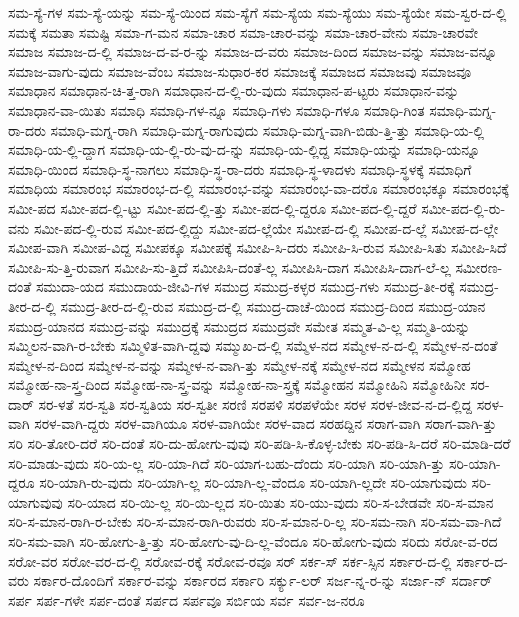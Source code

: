 {ಸಮ-ಸ್ಯೆ-ಗಳ
ಸಮ-ಸ್ಯೆ-ಯನ್ನು
ಸಮ-ಸ್ಯೆ-ಯಿಂದ
ಸಮ-ಸ್ಯೆಗೆ
ಸಮ-ಸ್ಯೆಯ
ಸಮ-ಸ್ಯೆಯು
ಸಮ-ಸ್ಯೆಯೇ
ಸಮ-ಸ್ವರ-ದ-ಲ್ಲಿ
ಸಮಕ್ಕೆ
ಸಮತಾ
ಸಮಷ್ಟಿ
ಸಮಾ-ಗ-ಮನ
ಸಮಾ-ಚಾರ
ಸಮಾ-ಚಾರ-ವನ್ನು
ಸಮಾ-ಚಾರ-ವೇನು
ಸಮಾ-ಚಾರವೇ
ಸಮಾಜ
ಸಮಾಜ-ದ-ಲ್ಲಿ
ಸಮಾಜ-ದ-ವ-ರ-ನ್ನು
ಸಮಾಜ-ದ-ವರು
ಸಮಾಜ-ದಿಂದ
ಸಮಾಜ-ವನ್ನು
ಸಮಾಜ-ವನ್ನೂ
ಸಮಾಜ-ವಾಗು-ವುದು
ಸಮಾಜ-ವೆಂಬ
ಸಮಾಜ-ಸುಧಾರ-ಕರ
ಸಮಾಜಕ್ಕೆ
ಸಮಾಜದ
ಸಮಾಜವು
ಸಮಾಜವೂ
ಸಮಾಧಾನ
ಸಮಾಧಾನ-ಚಿ-ತ್ತ-ರಾಗಿ
ಸಮಾಧಾನ-ದ-ಲ್ಲಿ-ರು-ವುದು
ಸಮಾಧಾನ-ಪ-ಟ್ಟರು
ಸಮಾಧಾನ-ವನ್ನು
ಸಮಾಧಾನ-ವಾ-ಯಿತು
ಸಮಾಧಿ
ಸಮಾಧಿ-ಗಳ-ನ್ನೂ
ಸಮಾಧಿ-ಗಳು
ಸಮಾಧಿ-ಗಳೂ
ಸಮಾಧಿ-ಗಿಂತ
ಸಮಾಧಿ-ಮಗ್ನ-ರಾ-ದರು
ಸಮಾಧಿ-ಮಗ್ನ-ರಾಗಿ
ಸಮಾಧಿ-ಮಗ್ನ-ರಾಗುವುದು
ಸಮಾಧಿ-ಮಗ್ನ-ವಾಗಿ-ಬಿಡು-ತ್ತಿ-ತ್ತು
ಸಮಾಧಿ-ಯ-ಲ್ಲಿ
ಸಮಾಧಿ-ಯ-ಲ್ಲಿ-ದ್ದಾಗ
ಸಮಾಧಿ-ಯ-ಲ್ಲಿ-ರು-ವು-ದ-ನ್ನು
ಸಮಾಧಿ-ಯ-ಲ್ಲಿದ್ದ
ಸಮಾಧಿ-ಯನ್ನು
ಸಮಾಧಿ-ಯನ್ನೂ
ಸಮಾಧಿ-ಯಿಂದ
ಸಮಾಧಿ-ಸ್ಥ-ನಾಗಲು
ಸಮಾಧಿ-ಸ್ಥ-ರಾ-ದರು
ಸಮಾಧಿ-ಸ್ಥ-ಳಾದಳು
ಸಮಾಧಿ-ಸ್ಥಳಕ್ಕೆ
ಸಮಾಧಿಗೆ
ಸಮಾಧಿಯ
ಸಮಾರಂಭ
ಸಮಾರಂಭ-ದ-ಲ್ಲಿ
ಸಮಾರಂಭ-ವನ್ನು
ಸಮಾರಂಭ-ವಾ-ದರೊ
ಸಮಾರಂಭಕ್ಕೂ
ಸಮಾರಂಭಕ್ಕೆ
ಸಮೀ-ಪದ
ಸಮೀ-ಪದ-ಲ್ಲಿ-ಟ್ಟು
ಸಮೀ-ಪದ-ಲ್ಲಿ-ತ್ತು
ಸಮೀ-ಪದ-ಲ್ಲಿ-ದ್ದರೂ
ಸಮೀ-ಪದ-ಲ್ಲಿ-ದ್ದರೆ
ಸಮೀ-ಪದ-ಲ್ಲಿ-ರು-ವನು
ಸಮೀ-ಪದ-ಲ್ಲಿ-ರುವ
ಸಮೀ-ಪದ-ಲ್ಲಿದ್ದು
ಸಮೀ-ಪದ-ಲ್ಲೆಯೇ
ಸಮೀಪ-ದ-ಲ್ಲಿ
ಸಮೀಪ-ದ-ಲ್ಲೆ
ಸಮೀಪ-ದ-ಲ್ಲೇ
ಸಮೀಪ-ವಾಗಿ
ಸಮೀಪ-ವಿದ್ದ
ಸಮೀಪಕ್ಕೂ
ಸಮೀಪಕ್ಕೆ
ಸಮೀಪಿ-ಸಿ-ದರು
ಸಮೀಪಿ-ಸಿ-ರುವ
ಸಮೀಪಿ-ಸಿತು
ಸಮೀಪಿ-ಸಿದೆ
ಸಮೀಪಿ-ಸು-ತ್ತಿ-ರುವಾಗ
ಸಮೀಪಿ-ಸು-ತ್ತಿದೆ
ಸಮೀಪಿಸಿ-ದಂತೆ-ಲ್ಲ
ಸಮೀಪಿಸಿ-ದಾಗ
ಸಮೀಪಿಸಿ-ದಾಗ-ಲೆ-ಲ್ಲ
ಸಮೀರಣ-ದಂತೆ
ಸಮುದಾ-ಯದ
ಸಮುದಾಯ-ಜೀವಿ-ಗಳ
ಸಮುದ್ರ
ಸಮುದ್ರ-ಕಳ್ಳರ
ಸಮುದ್ರ-ಗಳು
ಸಮುದ್ರ-ತೀ-ರಕ್ಕೆ
ಸಮುದ್ರ-ತೀರ-ದ-ಲ್ಲಿ
ಸಮುದ್ರ-ತೀರ-ದ-ಲ್ಲಿ-ರುವ
ಸಮುದ್ರ-ದ-ಲ್ಲಿ
ಸಮುದ್ರ-ದಾಚೆ-ಯಿಂದ
ಸಮುದ್ರ-ದಿಂದ
ಸಮುದ್ರ-ಯಾನ
ಸಮುದ್ರ-ಯಾನದ
ಸಮುದ್ರ-ವನ್ನು
ಸಮುದ್ರಕ್ಕೆ
ಸಮುದ್ರದ
ಸಮುದ್ರವೇ
ಸಮೇತ
ಸಮ್ಮತ-ವಿ-ಲ್ಲ
ಸಮ್ಮತಿ-ಯನ್ನು
ಸಮ್ಮಿಲನ-ವಾಗಿ-ರ-ಬೇಕು
ಸಮ್ಮಿಳಿತ-ವಾಗಿ-ದ್ದವು
ಸಮ್ಮುಖ-ದ-ಲ್ಲಿ
ಸಮ್ಮೆಳ-ನದ
ಸಮ್ಮೇಳ-ನ-ದ-ಲ್ಲಿ
ಸಮ್ಮೇಳ-ನ-ದಂತೆ
ಸಮ್ಮೇಳ-ನ-ದಿಂದ
ಸಮ್ಮೇಳ-ನ-ವನ್ನು
ಸಮ್ಮೇಳ-ನ-ವಾಗಿ-ತ್ತು
ಸಮ್ಮೇಳ-ನಕ್ಕೆ
ಸಮ್ಮೇಳ-ನದ
ಸಮ್ಮೇಳನ
ಸಮ್ಮೋಹ
ಸಮ್ಮೋಹ-ನಾ-ಸ್ತ್ರ-ದಿಂದ
ಸಮ್ಮೋಹ-ನಾ-ಸ್ತ್ರ-ವನ್ನು
ಸಮ್ಮೋಹ-ನಾ-ಸ್ತ್ರಕ್ಕೆ
ಸಮ್ಮೋಹನ
ಸಮ್ಮೋಹಿನಿ
ಸಮ್ಮೋಹಿನೀ
ಸರ-ದಾರ್
ಸರ-ಳತೆ
ಸರ-ಸ್ವತಿ
ಸರ-ಸ್ವತಿಯ
ಸರ-ಸ್ವತೀ
ಸರಣಿ
ಸರಪಳಿ
ಸರಪಳೆಯೇ
ಸರಳ
ಸರಳ-ಜೀವ-ನ-ದ-ಲ್ಲಿದ್ದ
ಸರಳ-ವಾಗಿ
ಸರಳ-ವಾಗಿ-ದ್ದರು
ಸರಳ-ವಾಗಿಯೂ
ಸರಳ-ವಾಗಿಯೇ
ಸರಳ-ವಾದ
ಸರಹದ್ದಿನ
ಸರಾಗ-ವಾಗಿ
ಸರಾಗ-ವಾಗಿ-ತ್ತು
ಸರಿ
ಸರಿ-ತೋರಿ-ದರೆ
ಸರಿ-ದಂತೆ
ಸರಿ-ದು-ಹೋಗು-ವುವು
ಸರಿ-ಪಡಿ-ಸಿ-ಕೊಳ್ಳ-ಬೇಕು
ಸರಿ-ಪಡಿ-ಸಿ-ದರೆ
ಸರಿ-ಮಾಡಿ-ದರೆ
ಸರಿ-ಮಾಡು-ವುದು
ಸರಿ-ಯ-ಲ್ಲ
ಸರಿ-ಯಾ-ಗಿದೆ
ಸರಿ-ಯಾಗ-ಬಹು-ದೆಂದು
ಸರಿ-ಯಾಗಿ
ಸರಿ-ಯಾಗಿ-ತ್ತು
ಸರಿ-ಯಾಗಿ-ದ್ದರೂ
ಸರಿ-ಯಾಗಿ-ರು-ವುದು
ಸರಿ-ಯಾಗಿ-ಲ್ಲ
ಸರಿ-ಯಾಗಿ-ಲ್ಲ-ವೆಂದೂ
ಸರಿ-ಯಾಗಿ-ಲ್ಲದೇ
ಸರಿ-ಯಾಗುವುದು
ಸರಿ-ಯಾಗುವುವು
ಸರಿ-ಯಾದ
ಸರಿ-ಯಿ-ಲ್ಲ
ಸರಿ-ಯಿ-ಲ್ಲದ
ಸರಿ-ಯಿತು
ಸರಿ-ಯು-ವುದು
ಸರಿ-ಸ-ಬೇಡವೇ
ಸರಿ-ಸ-ಮಾನ
ಸರಿ-ಸ-ಮಾನ-ರಾಗಿ-ರ-ಬೇಕು
ಸರಿ-ಸ-ಮಾನ-ರಾಗಿ-ರುವರು
ಸರಿ-ಸ-ಮಾನ-ರಿ-ಲ್ಲ
ಸರಿ-ಸಮ-ನಾಗಿ
ಸರಿ-ಸಮ-ವಾ-ಗಿದೆ
ಸರಿ-ಸಮ-ವಾಗಿ
ಸರಿ-ಹೋಗು-ತ್ತಿ-ತ್ತು
ಸರಿ-ಹೋಗು-ವು-ದಿ-ಲ್ಲ-ವೆಂದೂ
ಸರಿ-ಹೋಗು-ವುದು
ಸರಿದು
ಸರೋ-ವ-ರದ
ಸರೋ-ವರ
ಸರೋ-ವರ-ದ-ಲ್ಲಿ
ಸರೋವ-ರಕ್ಕೆ
ಸರೋವ-ರವೂ
ಸರ್
ಸರ್ಕ-ಸ್
ಸರ್ಕ-ಸ್ಸಿನ
ಸರ್ಕಾರ-ದ-ಲ್ಲಿ
ಸರ್ಕಾರ-ದ-ವರು
ಸರ್ಕಾರ-ದೊಂದಿಗೆ
ಸರ್ಕಾರ-ವನ್ನು
ಸರ್ಕಾರದ
ಸರ್ಕಾರಿ
ಸರ್ಕ್ಯು-ಲರ್
ಸರ್ಜ-ನ್ನ-ರ-ನ್ನು
ಸರ್ಜಾ-ನ್
ಸರ್ದಾರ್
ಸರ್ಪ
ಸರ್ಪ-ಗಳೇ
ಸರ್ಪ-ದಂತೆ
ಸರ್ಪದ
ಸರ್ಪವೂ
ಸರ್ಬಿಯ
ಸರ್ವ
ಸರ್ವ-ಜ-ನರೂ
}
